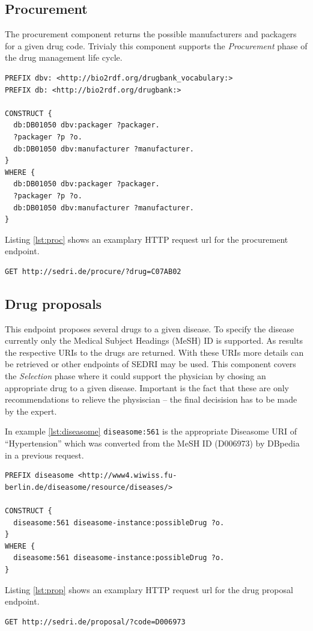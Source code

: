 \subsection*{Procurement}
The procurement component returns the possible manufacturers and packagers for a given drug code.
Trivialy this component supports the \textit{Procurement} phase of the drug management life cycle.

\begin{lstlisting}[caption=Example Drugbank query for procurement meta data of Ibuprofen]
PREFIX dbv: <http://bio2rdf.org/drugbank_vocabulary:>
PREFIX db: <http://bio2rdf.org/drugbank:>

CONSTRUCT {
  db:DB01050 dbv:packager ?packager.
  ?packager ?p ?o.
  db:DB01050 dbv:manufacturer ?manufacturer.
}
WHERE {
  db:DB01050 dbv:packager ?packager.
  ?packager ?p ?o.
  db:DB01050 dbv:manufacturer ?manufacturer.
}
\end{lstlisting}
Listing \ref{lst:proc} shows an examplary HTTP request url for the procurement endpoint.
\begin{lstlisting}[label=lst:proc,caption=Example request for the procurement endpoint]
  GET http://sedri.de/procure/?drug=C07AB02
\end{lstlisting}

\subsection*{Drug proposals}
This endpoint proposes several drugs to a given disease.
To specify the disease currently only the Medical Subject Headings (MeSH) ID is supported.
As results the respective URIs to the drugs are returned.
With these URIs more details can be retrieved or other endpoints of SEDRI may be used.
This component covers the \textit{Selection} phase where it could support the physician by chosing an appropriate drug to a given disease.
Important is the fact that these are only recommendations to relieve the physiscian -- the final decisision has to be made by the expert.

In example \ref{lst:diseasome} \texttt{diseasome:561} is the appropriate Diseasome URI of ``Hypertension'' which was converted from the MeSH ID (D006973) by DBpedia in a previous request.

\begin{lstlisting}[caption=Example Diseasome query for possible drugs of Hypertension,label=lst:diseasome]
PREFIX diseasome <http://www4.wiwiss.fu-berlin.de/diseasome/resource/diseases/>

CONSTRUCT {
  diseasome:561 diseasome-instance:possibleDrug ?o.
}
WHERE {
  diseasome:561 diseasome-instance:possibleDrug ?o.
}
\end{lstlisting}
Listing \ref{lst:prop} shows an examplary HTTP request url for the drug proposal endpoint.
\begin{lstlisting}[label=lst:prop,caption=Example request for the drug proposal endpoint]
  GET http://sedri.de/proposal/?code=D006973
\end{lstlisting}

